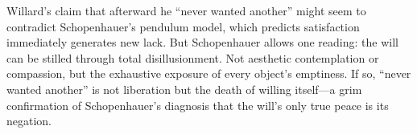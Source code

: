 Willard's claim that afterward he ``never wanted another'' might seem to contradict 
Schopenhauer's pendulum model, which predicts satisfaction immediately generates new lack. But 
Schopenhauer allows one reading: the will can be stilled through total disillusionment. Not 
aesthetic contemplation or compassion, but the exhaustive exposure of every object's 
emptiness. If so, ``never wanted another'' is not liberation but the death of willing 
itself---a grim confirmation of Schopenhauer's diagnosis that the will's only true peace is 
its negation.
